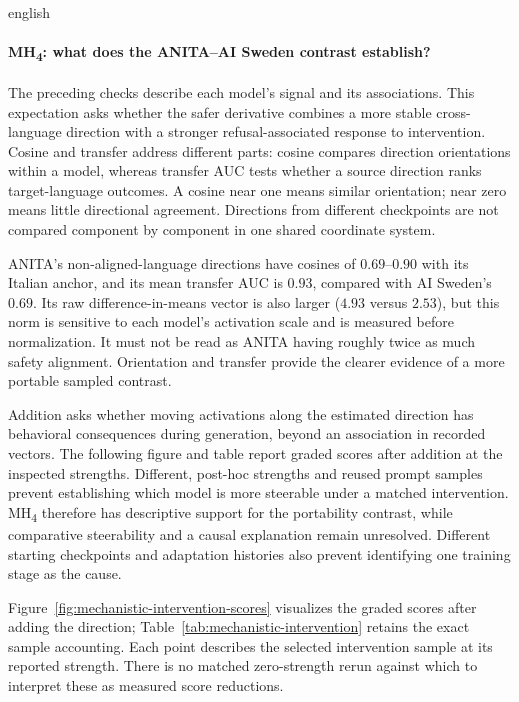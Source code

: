 \begin{otherlanguage*}{english}
\GradedMechanisticCorrelationTable

\FloatBarrier
{}
\paragraph*{MH\textsubscript{4}: what does the ANITA--AI Sweden contrast establish?} The preceding checks describe each model's signal and its associations. This expectation asks whether the safer derivative combines a more stable cross-language direction with a stronger refusal-associated response to intervention. Cosine and transfer address different parts: cosine compares direction orientations within a model, whereas transfer AUC tests whether a source direction ranks target-language outcomes. A cosine near one means similar orientation; near zero means little directional agreement. Directions from different checkpoints are not compared component by component in one shared coordinate system.

ANITA's non-aligned-language directions have cosines of $0.69$--$0.90$ with its Italian anchor, and its mean transfer AUC is $0.93$, compared with AI Sweden's $0.69$. Its raw difference-in-means vector is also larger ($4.93$ versus $2.53$), but this norm is sensitive to each model's activation scale and is measured before normalization. It must not be read as ANITA having roughly twice as much safety alignment. Orientation and transfer provide the clearer evidence of a more portable sampled contrast.

Addition asks whether moving activations along the estimated direction has behavioral consequences during generation, beyond an association in recorded vectors. The following figure and table report graded scores after addition at the inspected strengths. Different, post-hoc strengths and reused prompt samples prevent establishing which model is more steerable under a matched intervention. MH\textsubscript{4} therefore has descriptive support for the portability contrast, while comparative steerability and a causal explanation remain unresolved. Different starting checkpoints and adaptation histories also prevent identifying one training stage as the cause.

\setcounter{secnumdepth}{3}

\clearpage
Figure~\ref{fig:mechanistic-intervention-scores} visualizes the graded scores after adding the direction; Table~\ref{tab:mechanistic-intervention} retains the exact sample accounting. Each point describes the selected intervention sample at its reported strength. There is no matched zero-strength rerun against which to interpret these as measured score reductions.


\end{otherlanguage*}
